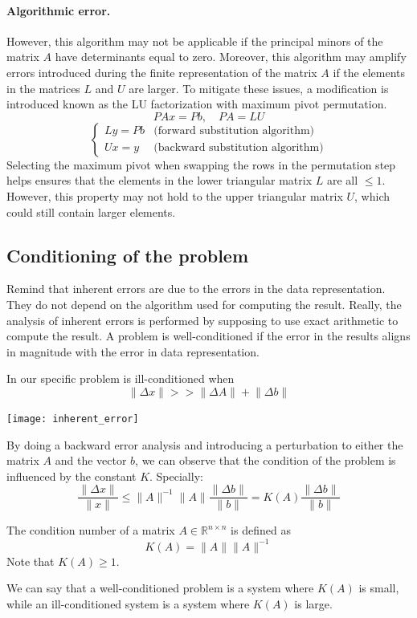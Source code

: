 \documentclass{article}
\begin{document}
\paragraph{Algorithmic error.} However, this algorithm may not be applicable
if the principal minors of the matrix $A$ have determinants equal to zero.
Moreover, this algorithm may amplify errors introduced during the finite
representation of the matrix $A$ if the elements in the matrices $L$ and $U$
are larger. To mitigate these issues, a modification is introduced known as
the LU factorization with maximum pivot permutation.
$$PAx=Pb,\quad PA=LU$$
$$\begin{cases}
    Ly=Pb & \text{(forward substitution algorithm)}\\
    Ux=y & \text{(backward substitution algorithm)}
\end{cases}
$$
Selecting the maximum pivot when swapping the rows in the permutation step
helps ensures that the elements in the lower triangular matrix $L$ are all
$\leq1$. However, this property may not hold to the upper triangular matrix
$U$, which could still contain larger elements.
\subsection{Conditioning of the problem}
Remind that inherent errors are due to the errors in the data representation.
They do not depend on the algorithm used for computing the result. Really, the
analysis of inherent errors is performed by supposing to use exact arithmetic
to compute the result. A problem is well-conditioned if the error in the
results aligns in magnitude with the error in data representation.

In our specific problem is ill-conditioned when
$$\lVert \Delta x\rVert>>\lVert \Delta A\rVert+ \lVert \Delta b\rVert$$
\begin{center}
    \texttt{[image: inherent\_error]}
\end{center}

By doing a backward error analysis and introducing a perturbation to either
the matrix $A$ and the vector $b$, we can observe that the condition of the
problem is influenced by the constant $K$. Specially:
$$\frac{\lVert \Delta x\rVert}{\lVert x\rVert}\leq \lVert A\rVert^{-1} \lVert
A\rVert \frac{\lVert \Delta b\rVert}{\lVert b\rVert}=K(A)\frac{\lVert \Delta
b\rVert}{\lVert b\rVert}$$
\begin{definition}
    The condition number of a matrix $A\in \mathbb{R}^{n\times n}$ is defined
    as 
    $$K(A)=\lVert A\rVert \lVert A\rVert^{-1}$$
    Note that $K(A)\geq1$.
\end{definition}
We can say that a well-conditioned problem is a system where $K(A)$ is small,
while an ill-conditioned system is a system where $K(A)$ is large.
\end{document}
